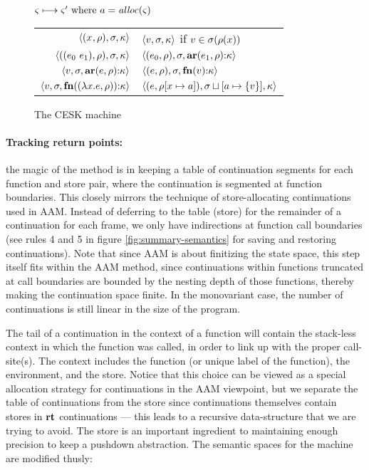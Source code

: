 \begin{figure}
  \centering
  $\varsigma \longmapsto \varsigma' \text{ where } a = \mathit{alloc}(\varsigma)$ \\
  \begin{tabular}{r|l}
    \hline
    $\langle (x^{{}}, \rho), \sigma, \kappa \rangle$
    &
    $\langle v,\sigma,\kappa \rangle$ if $v \in \sigma(\rho(x))$
    \\
    $\langle ((e_{0}\ e_{1}){}, \rho), \sigma, \kappa \rangle$
    &
    $\langle (e_{0}, \rho), \sigma, \mathbf{ar}{}(e_{1},\rho){\tt :} \kappa \rangle$
    \\
    $\langle v, \sigma, \mathbf{ar}{}(e,\rho){\tt :} \kappa \rangle$
    &
    $\langle (e, \rho), \sigma, \mathbf{fn}{}(v){\tt :} \kappa \rangle$
    \\
    $\langle v,\sigma,\mathbf{fn}{}((\lambda{} x. e, \rho)){\tt :} \kappa \rangle$
    &
    $\langle (e, \rho[x \mapsto a]), \sigma\sqcup[a \mapsto \{ v \}], \kappa \rangle$
  \end{tabular}
  \caption{The CESK machine}
  \label{fig:base-semantics}
\end{figure}

\paragraph{Tracking return points:} the magic of the method is in keeping a table of continuation segments for each function and store pair, where the continuation is segmented at function boundaries.
%
This closely mirrors the technique of store-allocating continuations used in AAM.
%
Instead of deferring to the table (store) for the remainder of a continuation for each frame, we only have indirections at function call boundaries (see rules 4 and 5 in figure \ref{fig:summary-semantics} for saving and restoring continuations).
%
Note that since AAM is about finitizing the state space, this step itself fits within the AAM method, since continuations within functions truncated at call boundaries are bounded by the nesting depth of those functions, thereby making the continuation space finite.
%
In the monovariant case, the number of continuations is still linear in the size of the program.

The tail of a continuation in the context of a function will contain the stack-less context in which the function was called, in order to link up with the proper call-site(s).
%
The context includes the function (or unique label of the function), the environment, and the store.
%
Notice that this choice can be viewed as a special allocation strategy for continuations in the AAM viewpoint, but we separate the table of continuations from the store since continuations themselves contain stores in $\mathbf{rt}$ continuations --- this leads to a recursive data-structure that we are trying to avoid.
%
The store is an important ingredient to maintaining enough precision to keep a pushdown abstraction.
%
The semantic spaces for the machine are modified thusly:

